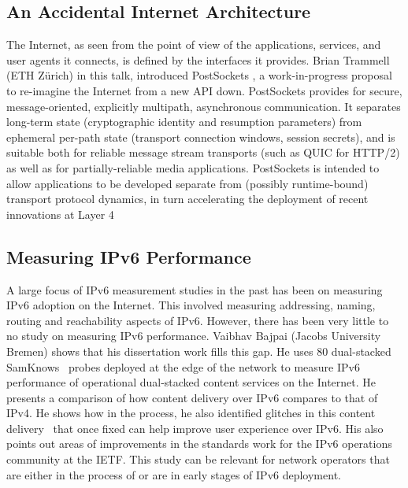 \subsection{An Accidental Internet Architecture}

The Internet, as seen from the point of view of the applications, services,
and user agents it connects, is defined by the interfaces it provides. Brian
Trammell (ETH Zürich) in this talk, introduced PostSockets
\cite{draft-trammell-post-sockets}, a work-in-progress proposal to re-imagine
the Internet from a new API down. PostSockets provides for secure,
message-oriented, explicitly multipath, asynchronous communication.  It
separates long-term state (cryptographic identity and resumption parameters)
from ephemeral per-path state (transport connection windows, session secrets),
and is suitable both for reliable message stream transports (such as QUIC for
HTTP/2) as well as for partially-reliable media applications. PostSockets is
intended to allow applications to be developed separate from (possibly
runtime-bound) transport protocol dynamics, in turn accelerating the
deployment of recent innovations at Layer 4

\subsection{Measuring IPv6 Performance}

A large focus of IPv6 measurement studies in the past has been on measuring
IPv6 adoption on the Internet. This involved measuring addressing, naming,
routing and reachability aspects of IPv6.  However, there has been very little
to no study on measuring IPv6 performance. Vaibhav Bajpai (Jacobs University
Bremen) shows that his dissertation work fills this gap. He uses 80
dual-stacked SamKnows~\cite{vbajpai:comst:2015} probes deployed at the edge of
the network to measure IPv6 performance of operational dual-stacked content
services on the Internet.  He presents a comparison of how content delivery
\cite{vbajpai:networking:2015, sahsan:pam:2015} over IPv6 compares to that of
IPv4. He shows how in the process, he also identified glitches in this content
delivery~\cite{seravuchira:cnsm:2016} that once fixed can help improve user
experience over IPv6. His also points out areas of improvements
\cite{vbajpai:anrw:2016} in the standards work for the IPv6 operations
community at the IETF\@. This study can be relevant for network operators that
are either in the process of or are in early stages of IPv6 deployment.


